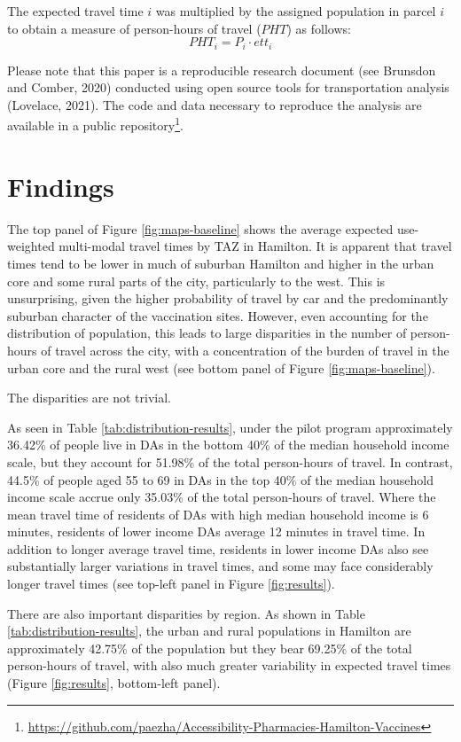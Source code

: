 \documentclass[]{elsarticle} %
\begin{document}
The expected travel time \(i\) was multiplied by the assigned population
in parcel \(i\) to obtain a measure of person-hours of travel (\(PHT\))
as follows: \[
PHT_i = P_i\cdot ett_i
\]

Please note that this paper is a reproducible research document (see
Brunsdon and Comber, 2020) conducted using open source tools for
transportation analysis (Lovelace, 2021). The code and data necessary to
reproduce the analysis are available in a public
repository\footnote{\url{https://github.com/paezha/Accessibility-Pharmacies-Hamilton-Vaccines}}.

\hypertarget{findings}{%
\section{Findings}\label{findings}}

The top panel of Figure \ref{fig:maps-baseline} shows the average
expected use-weighted multi-modal travel times by TAZ in Hamilton. It is
apparent that travel times tend to be lower in much of suburban Hamilton
and higher in the urban core and some rural parts of the city,
particularly to the west. This is unsurprising, given the higher
probability of travel by car and the predominantly suburban character of
the vaccination sites. However, even accounting for the distribution of
population, this leads to large disparities in the number of
person-hours of travel across the city, with a concentration of the
burden of travel in the urban core and the rural west (see bottom panel
of Figure \ref{fig:maps-baseline}).

The disparities are not trivial.

As seen in Table \ref{tab:distribution-results}, under the pilot program
approximately 36.42\% of people live in DAs in the bottom 40\% of the
median household income scale, but they account for 51.98\% of the total
person-hours of travel. In contrast, 44.5\% of people aged 55 to 69 in
DAs in the top 40\% of the median household income scale accrue only
35.03\% of the total person-hours of travel. Where the mean travel time
of residents of DAs with high median household income is 6 minutes,
residents of lower income DAs average 12 minutes in travel time. In
addition to longer average travel time, residents in lower income DAs
also see substantially larger variations in travel times, and some may
face considerably longer travel times (see top-left panel in Figure
\ref{fig:results}).

There are also important disparities by region. As shown in Table
\ref{tab:distribution-results}, the urban and rural populations in
Hamilton are approximately 42.75\% of the population but they bear
69.25\% of the total person-hours of travel, with also much greater
variability in expected travel times (Figure \ref{fig:results},
bottom-left panel).
\end{document}
